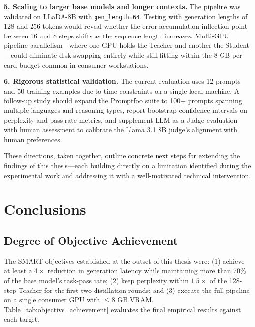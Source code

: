 \documentclass[11pt, a4paper]{article}
\begin{document}
\textbf{5. Scaling to larger base models and longer contexts.} The pipeline was validated on LLaDA-8B with \texttt{gen\_length=64}. Testing with generation lengths of 128 and 256 tokens would reveal whether the error-accumulation inflection point between 16 and 8 steps shifts as the sequence length increases. Multi-GPU pipeline parallelism---where one GPU holds the Teacher and another the Student---could eliminate disk swapping entirely while still fitting within the 8 GB per-card budget common in consumer workstations.

\textbf{6. Rigorous statistical validation.} The current evaluation uses 12 prompts and 50 training examples due to time constraints on a single local machine. A follow-up study should expand the Promptfoo suite to 100+ prompts spanning multiple languages and reasoning types, report bootstrap confidence intervals on perplexity and pass-rate metrics, and supplement LLM-as-a-Judge evaluation with human assessment to calibrate the Llama 3.1 8B judge's alignment with human preferences.

These directions, taken together, outline concrete next steps for extending the findings of this thesis---each building directly on a limitation identified during the experimental work and addressing it with a well-motivated technical intervention.

\newpage
\section{Conclusions}
\label{sec:conclusions}

\subsection{Degree of Objective Achievement}
\label{subsec:objective_achievement}

The SMART objectives established at the outset of this thesis were: (1) achieve at least a $4\times$ reduction in generation latency while maintaining more than 70\% of the base model's task-pass rate; (2) keep perplexity within $1.5\times$ of the 128-step Teacher for the first two distillation rounds; and (3) execute the full pipeline on a single consumer GPU with $\leq$8 GB VRAM. Table~\ref{tab:objective_achievement} evaluates the final empirical results against each target.
\end{document}
